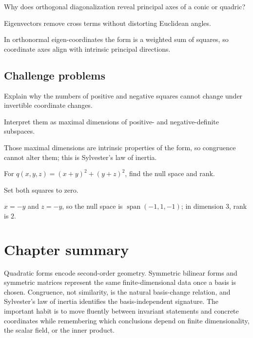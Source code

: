 \begin{exercise}\label{exr:i17-expand-14}
Why does orthogonal diagonalization reveal principal axes of a conic or quadric?
\end{exercise}
\begin{hint}
Eigenvectors remove cross terms without distorting Euclidean angles.
\end{hint}
\begin{solution}
In orthonormal eigen-coordinates the form is a weighted sum of squares, so coordinate axes align with intrinsic principal directions.
\end{solution}

\subsection*{Challenge problems}

\begin{exercise}\label{exr:i17-expand-15}
Explain why the numbers of positive and negative squares cannot change under invertible coordinate changes.
\end{exercise}
\begin{hint}
Interpret them as maximal dimensions of positive- and negative-definite subspaces.
\end{hint}
\begin{solution}
Those maximal dimensions are intrinsic properties of the form, so congruence cannot alter them; this is Sylvester's law of inertia.
\end{solution}

\begin{exercise}\label{exr:i17-expand-16}
For \(q(x,y,z)=(x+y)^2+(y+z)^2\), find the null space and rank.
\end{exercise}
\begin{hint}
Set both squares to zero.
\end{hint}
\begin{solution}
\(x=-y\) and \(z=-y\), so the null space is \(\operatorname{span}(-1,1,-1)\); in dimension \(3\), rank is \(2\).
\end{solution}
\section*{Chapter summary}
Quadratic forms encode second-order geometry. Symmetric bilinear forms and symmetric matrices represent the same finite-dimensional data once a basis is chosen. Congruence, not similarity, is the natural basis-change relation, and Sylvester's law of inertia identifies the basis-independent signature.
The important habit is to move fluently between invariant statements and concrete coordinates while remembering which conclusions depend on finite dimensionality, the scalar field, or the inner product.
